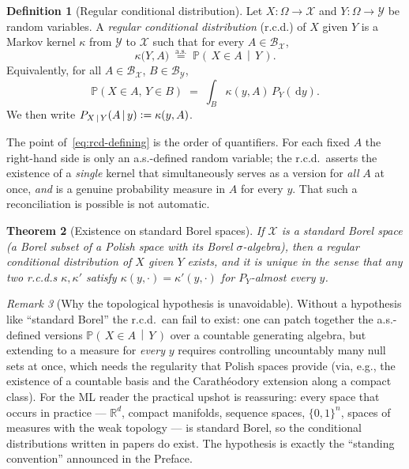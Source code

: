 \documentclass[11pt,oneside]{report}
\theoremstyle{plain}
\newtheorem{theorem}{Theorem}[chapter]
\theoremstyle{definition}
\newtheorem{definition}[theorem]{Definition}
\theoremstyle{remark}
\newtheorem{remark}[theorem]{Remark}
\newcommand{\R}{\mathbb{R}}
\newcommand{\Prob}{\mathbb{P}}
\newcommand{\dd}{\,\mathrm{d}}
\newcommand{\Bcal}{\mathcal{B}}
\newcommand{\Xcal}{\mathcal{X}}
\newcommand{\Ycal}{\mathcal{Y}}
\newcommand{\eqas}{\overset{\text{a.s.}}{=}}
\newcommand{\defeq}{\vcentcolon=}
\newcommand{\given}{\,\vert\,}
\newcommand{\cProb}[2]{\Prob\!\left(\,#1 \,\middle|\, #2\,\right)}
\numberwithin{equation}{chapter}
\begin{document}
\begin{definition}[Regular conditional distribution]\label{def:rcd}
Let $X:\Omega\to\Xcal$ and $Y:\Omega\to\Ycal$ be random variables. A
\emph{regular conditional distribution} (r.c.d.) of $X$ given $Y$ is a
Markov kernel $\kappa$ from $\Ycal$ to $\Xcal$ such that for every
$A\in\Bcal_\Xcal$,
\begin{equation}\label{eq:rcd-defining}
  \kappa\bigl(Y,A\bigr)\;\eqas\;\cProb{X\in A}{Y}.
\end{equation}
Equivalently, for all $A\in\Bcal_\Xcal$, $B\in\Bcal_\Ycal$,
\begin{equation}\label{eq:rcd-joint}
  \Prob(X\in A,\,Y\in B)\;=\;\int_B \kappa(y,A)\,P_Y(\dd y).
\end{equation}
We then write $P_{X\given Y}(A\given y)\defeq\kappa(y,A)$.
\end{definition}

The point of~\eqref{eq:rcd-defining} is the order of quantifiers. For each
fixed $A$ the right-hand side is only an a.s.-defined random variable; the
r.c.d.\ asserts the existence of a \emph{single} kernel that
simultaneously serves as a version for \emph{all} $A$ at once, \emph{and}
is a genuine probability measure in $A$ for every $y$. That such a
reconciliation is possible is not automatic.

\begin{theorem}[Existence on standard Borel spaces]\label{thm:rcd-exists}
If $\Xcal$ is a standard Borel space (a Borel subset of a Polish space with
its Borel $\sigma$-algebra), then a regular conditional distribution of $X$
given $Y$ exists, and it is unique in the sense that any two r.c.d.s
$\kappa,\kappa'$ satisfy $\kappa(y,\cdot)=\kappa'(y,\cdot)$ for
$P_Y$-almost every $y$.
\end{theorem}

\begin{remark}[Why the topological hypothesis is unavoidable]
Without a hypothesis like ``standard Borel'' the r.c.d.\ can fail to exist:
one can patch together the a.s.-defined versions $\cProb{X\in A}{Y}$ over a
countable generating algebra, but extending to a measure for \emph{every}
$y$ requires controlling uncountably many null sets at once, which needs
the regularity that Polish spaces provide (via, e.g., the existence of
a countable basis and the Carath\'eodory extension along a compact class).
For the ML reader the practical upshot is reassuring: every space that
occurs in practice --- $\R^d$, compact manifolds, sequence spaces,
$\{0,1\}^n$, spaces of measures with the weak topology --- is standard
Borel, so the conditional distributions written in papers do exist. The
hypothesis is exactly the ``standing convention'' announced in the Preface.
\end{remark}
\end{document}
